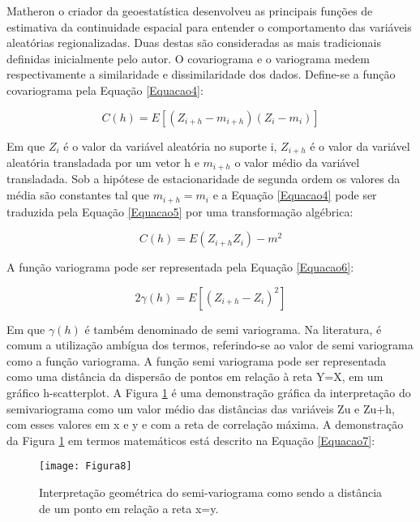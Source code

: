 Matheron o criador da geoestatística desenvolveu as principais funções de estimativa da continuidade espacial para entender o comportamento das variáveis aleatórias regionalizadas. Duas destas são consideradas as mais tradicionais definidas inicialmente pelo autor. O covariograma e o variograma medem respectivamente a similaridade e dissimilaridade dos dados. Define-se a função covariograma pela Equação \ref{Equacao4}:

\begin{equation}\label{Equacao4}
C(h) = E\left[ \left( Z_{i+h} - m_{i+h} \right) \left( Z_i -m_i\right) \right] 
\end{equation}

Em que $Z_i$ é o valor da variável aleatória no suporte i, $Z_{i+h}$ é o valor da variável aleatória transladada por um vetor h e $m_{i+h}$ o valor médio da variável transladada. Sob a hipótese de estacionaridade de segunda ordem os valores da média são constantes tal que $m_{i+h}=m_i$ e a Equação \ref{Equacao4}  pode ser traduzida pela Equação \ref{Equacao5} por uma transformação algébrica: 

\begin{equation}\label{Equacao5}
C(h) = E\left( Z_{i+h}Z_i\right)  -m^2
\end{equation}

A função variograma pode ser representada pela Equação \ref{Equacao6}:

\begin{equation}\label{Equacao6}
2\gamma(h) = E\left[ \left( Z_{i+h}-Z_i\right)^2\right] 
\end{equation}

Em que $\gamma(h)$ é também denominado de semi variograma. Na literatura, é comum a utilização ambígua dos termos, referindo-se ao valor de semi variograma como a função variograma. A função semi variograma pode ser representada como uma distância da dispersão de pontos em relação à reta Y=X, em um gráfico h-scatterplot.  A Figura \ref{Figura8} é uma demonstração gráfica da interpretação do semivariograma como um valor médio das distâncias das variáveis Zu e Zu+h, com esses valores em x e y e com a reta de correlação máxima. A demonstração da Figura \ref{Figura8} em termos matemáticos está descrito na Equação \ref{Equacao7}:

\begin{figure}[H]
	\centering
	\texttt{[image: Figura8]}
	\caption{Interpretação geométrica do semi-variograma como sendo a distância de um ponto em relação a reta x=y.}
	\label{Figura8}
\end{figure}

